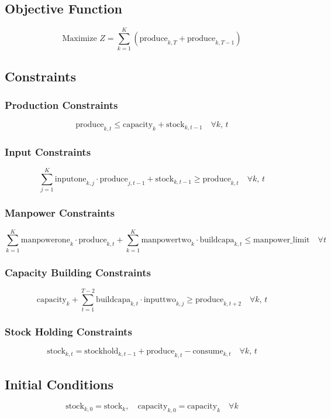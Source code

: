 \documentclass{article}
\begin{document}
\subsection*{Objective Function}
\[
\text{Maximize } Z = \sum_{k=1}^{K} \left( \text{produce}_{k, T} + \text{produce}_{k, T-1} \right)
\]

\subsection*{Constraints}

\subsubsection*{Production Constraints}
\[
\text{produce}_{k, t} \leq \text{capacity}_{k} + \text{stock}_{k, t-1} \quad \forall k, \, t
\]

\subsubsection*{Input Constraints}
\[
\sum_{j=1}^{K} \text{inputone}_{k,j} \cdot \text{produce}_{j, t-1} + \text{stock}_{k, t-1} \geq \text{produce}_{k, t} \quad \forall k, \, t
\]

\subsubsection*{Manpower Constraints}
\[
\sum_{k=1}^{K} \text{manpowerone}_{k} \cdot \text{produce}_{k, t} + \sum_{k=1}^{K} \text{manpowertwo}_{k} \cdot \text{buildcapa}_{k, t} \leq \text{manpower\_limit} \quad \forall t
\]

\subsubsection*{Capacity Building Constraints}
\[
\text{capacity}_{k} + \sum_{t=1}^{T-2} \text{buildcapa}_{k, t} \cdot \text{inputtwo}_{k,j} \geq \text{produce}_{k, t+2} \quad \forall k, \, t
\]

\subsubsection*{Stock Holding Constraints}
\[
\text{stock}_{k, t} = \text{stockhold}_{k, t-1} + \text{produce}_{k, t} - \text{consume}_{k, t} \quad \forall k, \, t
\]

\subsection*{Initial Conditions}
\[
\text{stock}_{k, 0} = \text{stock}_{k}, \quad \text{capacity}_{k, 0} = \text{capacity}_{k} \quad \forall k
\]
\end{document}
